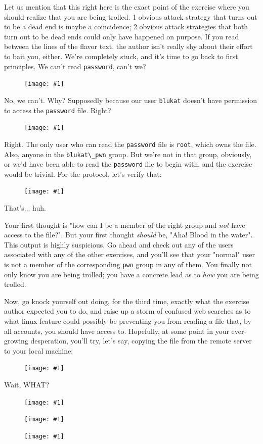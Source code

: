 \documentclass{article}
\newcommand{\displayimage}[1] {
\begin{figure}[H]
    \centering
    \texttt{[image: \#1]} 
\end{figure}
}
\newcommand{\xcode}[2]{\colorbox{ubuntuback}{\lstinline[language=#1]|#2|}}
\newcommand{\code}[1]{\colorbox{ubuntuback}{\texttt{#1}}}
\begin{document}
Let us mention that this right here is the exact point of the exercise where you should realize that you are being trolled. 1 obvious attack strategy that turns out to be a dead end is maybe a coincidence; 2 obvious attack strategies that both turn out to be dead ends could only have happened on purpose. If you read between the lines of the flavor text, the author isn't really shy about their effort to bait you, either.  We're completely stuck, and it's time to go back to first principles. We can't read \xcode{C}{password}, can't we?  
\displayimage{../19_blukat/cat_password.png}

No, we can't. Why? Supposedly because our user \xcode{bash}{blukat} doesn't have permission to access the \xcode{bash}{password} file. Right?

\displayimage{../19_blukat/file_permissions.png}

Right. The only user who can read the \xcode{bash}{password} file is \xcode{bash}{root}, which owns the file. Also, anyone in the \xcode{bash}{blukat\_pwn} group. But we're not in that group, obviously, or we'd have been able to read the \xcode{bash}{password} file to begin with, and the exercise would be trivial. For the protocol, let's verify that:

\displayimage{../19_blukat/group_check.png}

That's... huh.

Your first thought is "how can I be a member of the right group and \textit{not} have access to the file?". But your first thought \textit{should} be, "Aha! Blood in the water". This output is highly suspicious. Go ahead and check out any of the users associated with any of the other exercises, and you'll see that your "normal" user is not a member of the corresponding \code{pwn} group in any of them. You finally not only know you are being trolled; you have a concrete lead as to \textit{how} you are being trolled.

Now, go knock yourself out doing, for the third time, exactly what the exercise author expected you to do, and raise up a storm of confused web searches as to what linux feature could possibly be preventing you from reading a file that, by all accounts, you should have access to. Hopefully, at some point in your ever-growing desperation, you'll try, let's say, copying the file from the remote server to your local machine:

\displayimage{../19_blukat/locally.png}

Wait, WHAT?

\displayimage{../19_blukat/python.png}
\displayimage{../19_blukat/nano.png}
\displayimage{../19_blukat/xxd.png}
\end{document}
